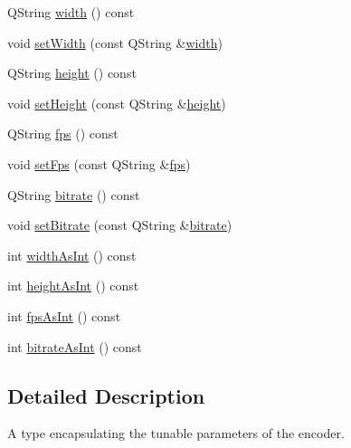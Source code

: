 \begin{DoxyCompactItemize}
Q\-String \hyperlink{classEncodingParameters_ad784bc5e0a14e537f1bef3340a5a816f}{width} () const 
\item 
void \hyperlink{classEncodingParameters_ad27a6d060f6c2cef8edae95c34ff6057}{set\-Width} (const Q\-String \&\hyperlink{classEncodingParameters_ad784bc5e0a14e537f1bef3340a5a816f}{width})
\item 
Q\-String \hyperlink{classEncodingParameters_a65eeab477e176c521ad2aab0e46606b6}{height} () const 
\item 
void \hyperlink{classEncodingParameters_a698b345c916c82afacbd754342e54c85}{set\-Height} (const Q\-String \&\hyperlink{classEncodingParameters_a65eeab477e176c521ad2aab0e46606b6}{height})
\item 
Q\-String \hyperlink{classEncodingParameters_aaae058a54aa6b2381047170d199a5131}{fps} () const 
\item 
void \hyperlink{classEncodingParameters_a373d758f8877691d2cf4c311ea8a4033}{set\-Fps} (const Q\-String \&\hyperlink{classEncodingParameters_aaae058a54aa6b2381047170d199a5131}{fps})
\item 
Q\-String \hyperlink{classEncodingParameters_a62e5d236efaa9594bd8706d9b6e79ba3}{bitrate} () const 
\item 
void \hyperlink{classEncodingParameters_afd3313d4a7dbbe7a41809f9538dea583}{set\-Bitrate} (const Q\-String \&\hyperlink{classEncodingParameters_a62e5d236efaa9594bd8706d9b6e79ba3}{bitrate})
\item 
int \hyperlink{classEncodingParameters_aee18788ce89380ed62cdb14bb63d5bc2}{width\-As\-Int} () const 
\item 
int \hyperlink{classEncodingParameters_a98c078933c042bd7350025f15cd45d9f}{height\-As\-Int} () const 
\item 
int \hyperlink{classEncodingParameters_ad6dd43bc2267ca979ed0df18163dabdf}{fps\-As\-Int} () const 
\item 
int \hyperlink{classEncodingParameters_aefccfdee4e2f60522637066501b0258c}{bitrate\-As\-Int} () const 
\end{DoxyCompactItemize}


\subsection{Detailed Description}
A type encapsulating the tunable parameters of the encoder. 

